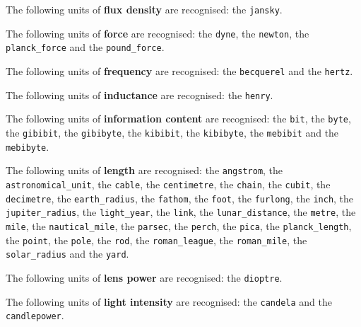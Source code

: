 \noindent The following units of {\bf flux density} are recognised:\newline
\noindent the {\tt jansky}.\vspace{5mm}

\noindent The following units of {\bf force} are recognised:\newline
\noindent the {\tt dyne}, the {\tt newton}, the {\tt planck\_\-force} and the {\tt pound\_\-force}.\vspace{5mm}

\noindent The following units of {\bf frequency} are recognised:\newline
\noindent the {\tt becquerel} and the {\tt hertz}.\vspace{5mm}

\noindent The following units of {\bf inductance} are recognised:\newline
\noindent the {\tt henry}.\vspace{5mm}

\noindent The following units of {\bf information content} are recognised:\newline
\noindent the {\tt bit}, the {\tt byte}, the {\tt gibibit}, the {\tt gibibyte}, the {\tt kibibit}, the {\tt kibibyte}, the {\tt mebibit} and the {\tt mebibyte}.\vspace{5mm}

\noindent The following units of {\bf length} are recognised:\newline
\noindent the {\tt angstrom}, the {\tt astronomical\_\-unit}, the {\tt cable}, the {\tt centimetre}, the {\tt chain}, the {\tt cubit}, the {\tt decimetre}, the {\tt earth\_\-radius}, the {\tt fathom}, the {\tt foot}, the {\tt furlong}, the {\tt inch}, the {\tt jupiter\_\-radius}, the {\tt light\_\-year}, the {\tt link}, the {\tt lunar\_\-distance}, the {\tt metre}, the {\tt mile}, the {\tt nautical\_\-mile}, the {\tt parsec}, the {\tt perch}, the {\tt pica}, the {\tt planck\_\-length}, the {\tt point}, the {\tt pole}, the {\tt rod}, the {\tt roman\_\-league}, the {\tt roman\_\-mile}, the {\tt solar\_\-radius} and the {\tt yard}.\vspace{5mm}

\noindent The following units of {\bf lens power} are recognised:\newline
\noindent the {\tt dioptre}.\vspace{5mm}

\noindent The following units of {\bf light intensity} are recognised:\newline
\noindent the {\tt candela} and the {\tt candlepower}.\vspace{5mm}

